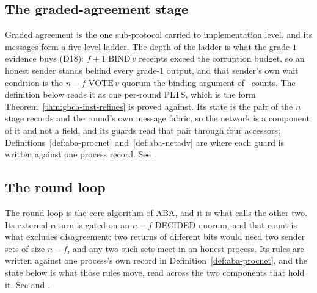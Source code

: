 




\subsection{The graded-agreement stage}

Graded agreement is the one sub-protocol carried to implementation level, and its messages form a five-level ladder.
The depth of the ladder is what the grade-$1$ evidence buys (D18): $f{+}1$ $\mathrm{BIND}\,v$ receipts exceed the corruption budget, so an honest sender stands behind every grade-$1$ output, and that sender's own wait condition is the $n{-}f$ $\mathrm{VOTE}\,v$ quorum the binding argument of~\cite{ABDY22} counts.
The definition below reads it as one per-round PLTS, which is the form Theorem~\ref{thm:gbca-inst-refines} is proved against.
Its state is the pair of the $n$ stage records and the round's own message fabric, so the network is a component of it and not a field, and its guards read that pair through four accessors; Definitions~\ref{def:aba-procnet} and~\ref{def:aba-netadv} are where each guard is written against one process record.
See .




\subsection{The round loop}

The round loop is the core algorithm of ABA, and it is what calls the other two.
Its external return is gated on an $n-f$ DECIDED quorum, and that count is what excludes disagreement: two returns of different bits would need two sender sets of size $n-f$, and any two such sets meet in an honest process.
Its rules are written against one process's own record in Definition~\ref{def:aba-procnet}, and the state below is what those rules move, read across the two components that hold it.
See  and .

